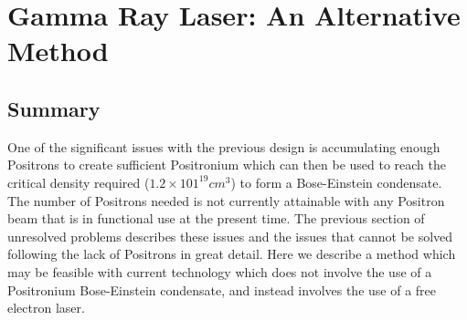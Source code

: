 
\chapter{Gamma Ray Laser: An Alternative Method} %

\label{Chapter6} %


\section{Summary}
One of the significant issues with the previous design is accumulating enough Positrons to create sufficient Positronium which can then be used to reach the critical density required ($1.2\times 101^{19} cm^3$) to form a Bose-Einstein condensate. The number of Positrons needed is not currently attainable with any Positron beam that is in functional use at the present time. The previous section of unresolved problems describes these issues and the issues that cannot be solved following the lack of Positrons in great detail. Here we describe a method which may be feasible with current technology which does not involve the use of a Positronium Bose-Einstein condensate, and instead involves the use of a free electron laser. 

